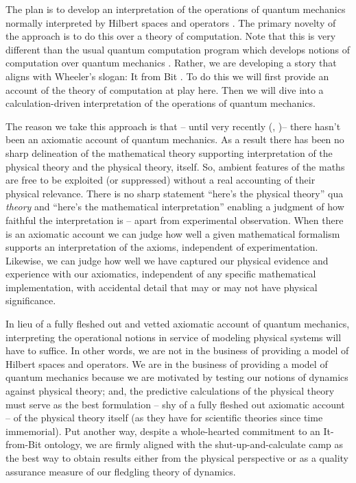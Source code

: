 The plan is to develop an interpretation of the operations of quantum
mechanics normally interpreted by Hilbert spaces and operators
\cite{MathematicalFoundationsQM}. The primary novelty of the approach
is to do this over a theory of computation. Note that this is very
different than the usual quantum computation program which develops
notions of computation over quantum mechanics \cite{544199}. Rather,
we are developing a story that aligns with Wheeler's slogan: It from
Bit \cite{HowComeTime}. To do this we will first provide an account of
the theory of computation at play here. Then we will dive into a
calculation-driven interpretation of the operations of quantum
mechanics.

The reason we take this approach is that -- until very recently
(\cite{DBLP:conf/lics/Abramsky04},
\cite{DBLP:conf/calco/Abramsky05})-- there hasn't been an axiomatic
account of quantum mechanics. As a result there has been no sharp
delineation of the mathematical theory supporting interpretation of
the physical theory and the physical theory, itself. So, ambient
features of the maths are free to be exploited (or suppressed) without
a real accounting of their physical relevance. There is no sharp
statement ``here's the physical theory'' qua \emph{theory} and
``here's the mathematical interpretation'' enabling a judgment of how
faithful the interpretation is -- apart from experimental
observation. When there is an axiomatic account we can judge how well
a given mathematical formalism supports an interpretation of the
axioms, independent of experimentation. Likewise, we can judge how
well we have captured our physical evidence and experience with our
axiomatics, independent of any specific mathematical implementation,
with accidental detail that may or may not have physical significance.

In lieu of a fully fleshed out and vetted axiomatic account of quantum
mechanics, interpreting the operational notions in service of modeling
physical systems will have to suffice. In other words, we are not in
the business of providing a model of Hilbert spaces and operators. We
are in the business of providing a model of quantum mechanics because
we are motivated by testing our notions of dynamics against physical
theory; and, the predictive calculations of the physical theory must
serve as the best formulation -- shy of a fully fleshed out axiomatic
account -- of the physical theory itself (as they have for scientific
theories since time immemorial). Put another way, despite a
whole-hearted commitment to an It-from-Bit ontology, we are firmly
aligned with the shut-up-and-calculate camp as the best way to obtain
results either from the physical perspective or as a quality assurance
measure of our fledgling theory of dynamics.

